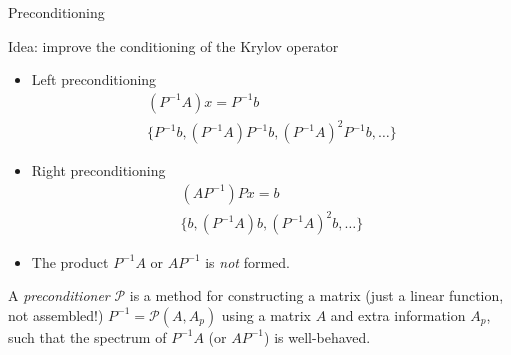 \begin{frame}{Preconditioning}
  \begin{block}{Idea: improve the conditioning of the Krylov operator}
    \begin{itemize}
    \item Left preconditioning
      \vspace{-1em}
      \begin{gather*}
        (P^{-1} A) x = P^{-1} b \\
        \{ P^{-1} b, (P^{-1}A) P^{-1} b, (P^{-1}A)^2 P^{-1} b, \dotsc \}
      \end{gather*}
    \item Right preconditioning
      \vspace{-1em}
      \begin{gather*}
        (A P^{-1}) P x = b \\
        \{ b, (P^{-1}A)b, (P^{-1}A)^2b, \dotsc \}
      \end{gather*}
    \item The product $P^{-1}A$ or $A P^{-1}$ is \emph{not} formed.
    \end{itemize}
  \end{block}
      A \emph{preconditioner} $\mathcal{P}$ is a method for constructing a
matrix (just a linear function, not assembled!)  $P^{-1} = \mathcal{P}(A,A_p)$
using a matrix $A$ and extra information $A_p$, such that the spectrum
of $P^{-1}A$ (or $A P^{-1}$) is well-behaved.
\end{frame}
